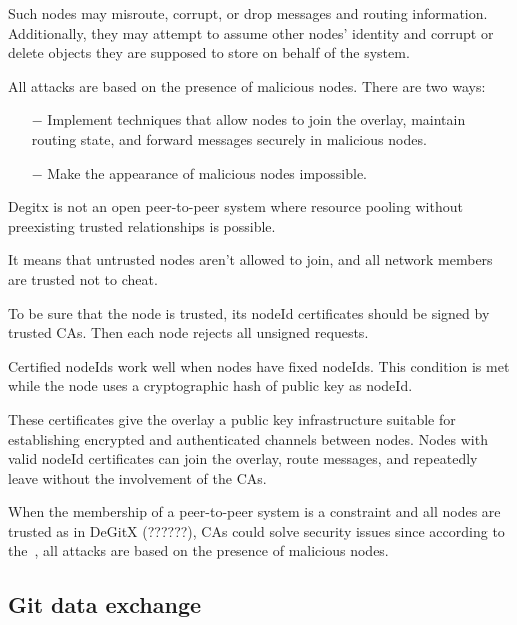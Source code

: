 \documentclass[acmlarge, screen, nonacm, 11pt]{acmart}
\begin{document}
Such nodes may misroute, corrupt, or drop messages and routing information.
Additionally, they may attempt to assume other nodes' identity and corrupt or delete objects
they are supposed to store on behalf of the system.

All attacks are based on the presence of malicious nodes.
There are two ways:
\begin{itemize}
  \item[$-$] Implement techniques that allow nodes to join the overlay,
    maintain routing state, and forward messages securely in malicious nodes.
  \item[$-$] Make the appearance of malicious nodes impossible.
\end{itemize}
Degitx is not an open peer-to-peer system
where resource pooling without preexisting trusted relationships is possible.

It means that untrusted nodes aren't allowed to join,
and all network members are trusted not to cheat.

To be sure that the node is trusted, its nodeId certificates should be signed by trusted CAs.
Then each node rejects all unsigned requests.

Certified nodeIds work well when nodes have fixed nodeIds.
This condition is met while the node uses a cryptographic hash of public key as nodeId.

These certificates give the overlay a public key infrastructure
suitable for establishing encrypted and authenticated channels between nodes.
Nodes with valid nodeId certificates can join the overlay, route messages,
and repeatedly leave without the involvement of the CAs.

When the membership of a peer-to-peer system is a constraint and all nodes are trusted as in DeGitX (??????),
CAs could solve security issues since according to the~\cite{Secure_routing_peer-to-peer_overlay_networks}, all attacks are based on the presence of malicious nodes.

\subsection{Git data exchange}\label{sec:data}
\end{document}
